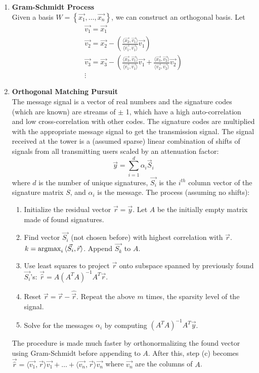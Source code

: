 \documentclass[10pt]{article}
\newcommand{\Est}[1]{\hat{#1}}
\newcommand{\argmax}{\operatornamewithlimits{argmax}}
\begin{document}
\begin{multicols}{2}
\begin{enumerate}
    \item \textbf{Gram-Schmidt Process} \\ Given a basis $W = \left\{\vec{x_1}, \hdots, \vec{x_n} \right\}$, we can construct an orthogonal basis. Let
    \begin{align*}
        \vec{v_1}=\vec{x_1} \\
        \vec{v_2}=\vec{x_2} - \left( \frac{\langle\vec{x_2}, \vec{v_1}\rangle}{\langle \vec{v_1}, \vec{v_1} \rangle}\vec{v_1} \right) \\
        \vec{v_3}=\vec{x_3} - \left( \frac{\langle\vec{x_3}, \vec{v_1}\rangle}{\langle \vec{v_1}, \vec{v_1} \rangle}\vec{v_1} + \frac{\langle\vec{x_3}, \vec{v_2}\rangle}{\langle \vec{v_2}, \vec{v_2} \rangle}\vec{v_2} \right) \\
        \vdots
    \end{align*}
    
    \item \textbf{Orthogonal Matching Pursuit} \\ The message signal is a vector of real numbers and the signature codes (which are known) are streams of $\pm$ 1, which have a high auto-correlation and low cross-correlation with other codes. The signature codes are multiplied with the appropriate message signal to get the transmission signal. The signal received at the tower is a (assumed sparse) linear combination of shifts of signals from all transmitting users scaled by an attenuation factor:
    $$\vec{y} = \sum_{i=1}^{d} \alpha_i \vec{S}_i$$
    where $d$ is the number of unique signatures, $\vec{S_i}$ is the $i^{th}$ column vector of the signature matrix $S$, and $\alpha_i$ is the message. The process (assuming no shifts):
    \begin{enumerate}
        \item Initialize the residual vector $\vec{r}=\vec{y}$. Let $A$ be the initially empty matrix made of found signatures.
        \item Find vector $\vec{S_i}$ (not chosen before) with highest correlation with $\vec{r}$. $k=\argmax_i{\langle \vec{S_i}, \vec{r} \rangle}$. Append $\vec{S_k}$ to $A$.
        \item Use least squares to project $\vec{r}$ onto subspace spanned by previously found $\vec{S_i}$'s: $\vec{\Est{r}}=A(A^TA)^{-1}A^T\vec{r}$.
        \item Reset $\vec{r}=\vec{r}-\Est{\vec{r}}$. Repeat the above $m$ times, the sparsity level of the signal.
        \item Solve for the messages $\alpha_i$ by computing $(A^TA)^{-1}A^T\vec{y}$.
    \end{enumerate}
    The procedure is made much faster by orthonormalizing the found vector using Gram-Schmidt before appending to $A$. After this, step (c) becomes $\vec{\Est{r}}=\langle \vec{v_1} , \vec{r} \rangle \vec{v_1} + \hdots + \langle \vec{v_n} , \vec{r} \rangle \vec{v_n}$ where $\vec{v_n}$ are the columns of $A$.
    

\end{enumerate}
\end{multicols}
\end{document}
